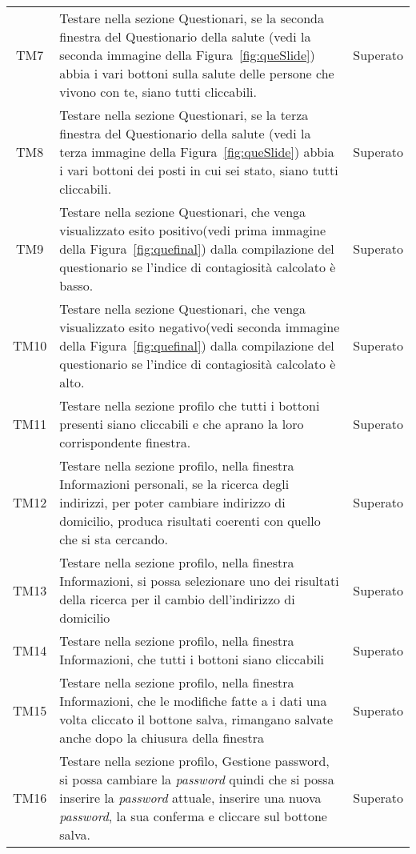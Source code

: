 \begin{table}[h]%
	\renewcommand{\arraystretch}{1.4}
	\centering
	\begin{tabularx}{\textwidth}{c X c}
		\hline	
		\rowcolor{heavenly}
		\intest{Codice} &  \intest{Descrizione} & \intest{Esito}\\	
		\hline	
		TM7 & Testare nella sezione Questionari, se la seconda finestra del Questionario della salute (vedi la seconda immagine della Figura~\ref{fig:queSlide}) abbia i vari bottoni sulla salute delle persone che vivono con te, siano tutti cliccabili. & Superato\\
		TM8 & Testare nella sezione Questionari, se la terza finestra del Questionario della salute (vedi la terza immagine della Figura~\ref{fig:queSlide}) abbia i vari bottoni dei posti in cui sei stato, siano tutti cliccabili. & Superato\\
		TM9 & Testare nella sezione Questionari, che venga visualizzato esito positivo(vedi prima immagine della Figura~\ref{fig:quefinal}) dalla compilazione del questionario se l'indice di contagiosità calcolato è basso. & Superato\\
		TM10 & Testare nella sezione Questionari, che venga visualizzato esito negativo(vedi seconda immagine della Figura~\ref{fig:quefinal}) dalla compilazione del questionario se l'indice di contagiosità calcolato è alto. & Superato\\
		TM11 & Testare nella sezione profilo che tutti i bottoni presenti siano cliccabili e che aprano la loro corrispondente finestra. & Superato\\
		TM12 & Testare nella sezione profilo, nella finestra Informazioni personali, se la ricerca degli indirizzi, per poter cambiare indirizzo di domicilio, produca risultati coerenti con quello che si sta cercando. & Superato\\
		TM13 & Testare nella sezione profilo, nella finestra Informazioni, si possa selezionare uno dei risultati della ricerca per il cambio dell'indirizzo di domicilio & Superato\\
		TM14 & Testare nella sezione profilo, nella finestra Informazioni, che tutti i bottoni siano cliccabili & Superato\\
		TM15 & Testare nella sezione profilo, nella finestra Informazioni, che le modifiche fatte a i dati una volta cliccato il bottone salva, rimangano salvate anche dopo la chiusura della finestra & Superato\\
		TM16 & Testare nella sezione profilo, Gestione password, si possa cambiare la \emph{password} quindi che si possa inserire la \emph{password} attuale, inserire una nuova \emph{password}, la sua conferma e cliccare sul bottone salva. & Superato\\

\end{tabularx}
\end{table}
